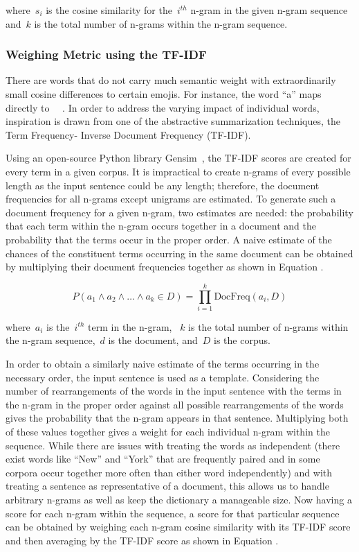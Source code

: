 \documentclass{article}[10]
\newcommand*{\img}[1]{%
  \raisebox{-.3\baselineskip}{%
    \texttt{[image: \#1]}%
  }%
}
\begin{document}
where~\(s_{i}\) is the cosine similarity for
the~\(i^{th}\) n-gram in the given n-gram sequence
and~\(k\) is the total number of n-grams within the n-gram
sequence.

\subsubsection{Weighing Metric using the TF-IDF\label{sec:TF-IDFWeighing}}

There are words that do not carry much semantic weight with
extraordinarily small cosine differences to certain emojis. For
instance, the word ``a'' maps directly to~~\img{emojis/1f4af.png}. In order to address the
varying impact of individual words, inspiration is drawn from one of the
abstractive summarization techniques, the Term Frequency- Inverse
Document Frequency (TF-IDF).

Using an open-source Python library Gensim~\cite{gensim}, the
TF-IDF scores are created for every term in a given corpus. It is
impractical to create n-grams of every possible length as the input
sentence could be any length; therefore, the document frequencies for
all n-grams except unigrams are estimated. To generate such a document
frequency for a given n-gram, two estimates are needed: the probability
that each term within the n-gram occurs together in a document and the
probability that the terms occur in the proper order. A naive estimate
of the chances of the constituent terms occurring in the same document
can be obtained by multiplying their document frequencies together as
shown in Equation .

\begin{equation}
  P(a_{1} \land a_{2} \land \ldots \land a_{k} \in D) = \prod_{i=1}^{k}\textrm{DocFreq}(a_{i}, D) \label{eq:TF-IDFWeighing}
\end{equation}

where~\(a_{i}\) is the~\(i^{th}\) term in the n-gram,
~\(k\) is the total number of n-grams within the
n-gram sequence,~\(d\) is the document,
and~\(D\) is the corpus.

In order to obtain a similarly naive estimate of the terms occurring in
the necessary order, the input sentence is used as a template.
Considering the number of rearrangements of the words in the input
sentence with the terms in the n-gram in the proper order against all
possible rearrangements of the words gives the probability that the
n-gram appears in that sentence. Multiplying both of these values
together gives a weight for each individual n-gram within the sequence.
While there are issues with treating the words as independent (there
exist words like ``New'' and ``York'' that are frequently paired and in
some corpora occur together more often than either word independently)
and with treating a sentence as representative of a document, this
allows us to handle arbitrary n-grams as well as keep the dictionary a
manageable size. Now having a score for each n-gram within the sequence,
a score for that particular sequence can be obtained by weighing each
n-gram cosine similarity with its TF-IDF score and then averaging by the
TF-IDF score as shown in Equation .
\end{document}

